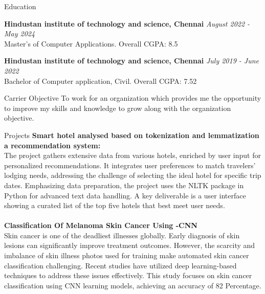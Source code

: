 \documentclass{resume} %
\begin{document}

\begin{rSection}{Education}

{\bf Hindustan institute of technology and science, Chennai} \hfill {\em August 2022 - May 2024} 
\\ Master's of Computer Applications.\hfill { Overall CGPA: 8.5 }

{\bf Hindustan institute of technology and science, Chennai} \hfill {\em July 2019 - June 2022} 
\\ Bachelor of Computer application, Civil.\hfill { Overall CGPA: 7.52 }


\end{rSection}

\begin{rSection}{Carrier Objective}
 To work for an organization which provides me the opportunity to improve my skills and knowledge to grow along with the organization objective.
\end{rSection}
\begin{rSection}{Projects}
{\bf Smart hotel analysed based on tokenization
and lemmatization a recommendation system:}
\\The project gathers extensive data from various hotels, enriched by user input for personalized recommendations. It integrates user preferences to match travelers' lodging needs, addressing the challenge of selecting the ideal hotel for specific trip dates. Emphasizing data preparation, the project uses the NLTK package in Python for advanced text data handling. A key deliverable is a user interface showing a curated list of the top five hotels that best meet user needs. \\
\\{\bf Classification Of Melanoma Skin
Cancer Using -CNN}\\
Skin cancer is one of the deadliest illnesses globally. Early diagnosis of skin lesions can significantly improve treatment outcomes. However, the scarcity and imbalance of skin illness photos used for training make automated skin cancer classification challenging. Recent studies have utilized deep learning-based techniques to address these issues effectively. This study focuses on skin cancer classification using CNN learning models, achieving an accuracy of 82 Percentage.\\

\end{rSection}
\end{document}
